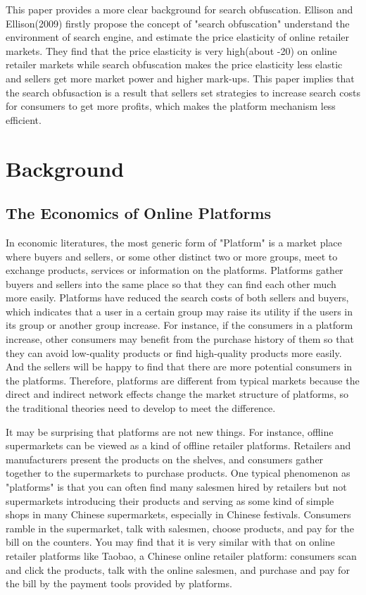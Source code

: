 \documentclass{article}
\begin{document}
This paper provides a more clear background for search obfuscation. Ellison and Ellison(2009) firstly propose the concept of "search obfuscation" understand the environment of search engine, and estimate the price elasticity of online retailer markets. They find that the price elasticity is very high(about -20) on online retailer markets while search obfuscation makes the price elasticity less elastic and sellers get more market power and higher mark-ups. This paper implies that the search obfusaction is a result that sellers set strategies to increase search costs for consumers to get more profits, which makes the platform mechanism less efficient. 


\section{Background}
\subsection{The Economics of Online Platforms}
In economic literatures, the most generic form of "Platform" is a market place where buyers and sellers, or some other distinct two or more groups, meet  to exchange products, services or information on the platforms. Platforms gather buyers and sellers into the same place so that they can find each other much more easily. Platforms have reduced the search costs of both sellers and buyers, which indicates that a user in a certain group may raise its utility if the users in its group or another group increase. For instance, if the consumers in a platform increase, other consumers may benefit from the purchase history of them so that they can avoid low-quality products or find high-quality products more easily. And the sellers will be happy to find that there are more potential consumers in the platforms. Therefore, platforms are different from typical markets because the direct and indirect network effects change the market structure of platforms, so the traditional theories need to develop to meet the difference. 

It may be surprising that platforms are not new things. For instance, offline supermarkets can be viewed as a kind of offline retailer platforms. Retailers and manufacturers present the products on the shelves, and consumers gather together to the supermarkets to purchase products. One typical phenomenon as "platforms" is that you can often find many salesmen hired by retailers but not supermarkets introducing their products and serving as some kind of simple shops in many Chinese supermarkets, especially in Chinese festivals. Consumers ramble in the supermarket, talk with salesmen, choose products, and pay for the bill on the counters. You may find that it is very similar with that on online retailer platforms like Taobao, a Chinese online retailer platform: consumers scan and click the products, talk with the online salesmen, and purchase and pay for the bill by the payment tools provided by platforms. 
\end{document}
